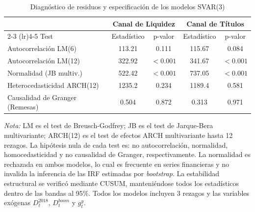 \begin{table}[htbp]
  \centering
  \begin{threeparttable}
    \caption{Diagnóstico de residuos y especificación de los modelos SVAR(3)}
    \label{tab:diagnostico}
    \begin{tabular}{l c c c c}
      \toprule
      & \multicolumn{2}{c}{\textbf{Canal de Liquidez}} & \multicolumn{2}{c}{\textbf{Canal de Títulos}} \\
      \cmidrule(lr){2-3} \cmidrule(lr){4-5}
      Test & Estadístico & p-valor & Estadístico & p-valor \\
      \midrule
      Autocorrelación LM(6)  & 113.21 & 0.111 & 115.67 & 0.084 \\
      Autocorrelación LM(12) & 322.92 & $<0.001$ & 341.67 & $<0.001$ \\
      Normalidad (JB multiv.) & 522.42 & $<0.001$ & 737.05 & $<0.001$ \\
      Heterocedasticidad ARCH(12) & 1235.2 & 0.234 & 1189.4 & 0.581 \\
      Causalidad de Granger (Remesas) & 0.504 & 0.872 & 0.313 & 0.971 \\
      \bottomrule
    \end{tabular}
    \begin{tablenotes}
      \small
      \item \textit{Nota:} LM es el test de Breusch-Godfrey; JB es el test de Jarque-Bera multivariante; ARCH(12) es el test de efectos ARCH multivariante hasta 12 rezagos. La hipótesis nula de cada test es: no autocorrelación, normalidad, homocedasticidad y no causalidad de Granger, respectivamente. La normalidad es rechazada en ambos modelos, lo cual es frecuente en series financieras y no invalida la inferencia de las IRF estimadas por \textit{bootstrap}. La estabilidad estructural se verificó mediante CUSUM, manteniéndose todos los estadísticos dentro de las bandas al 95\%. Todos los modelos incluyen 3 rezagos y las variables exógenas $D_t^{2018}$, $D_t^{boom}$ y $g_t^y$.
    \end{tablenotes}
  \end{threeparttable}
\end{table}